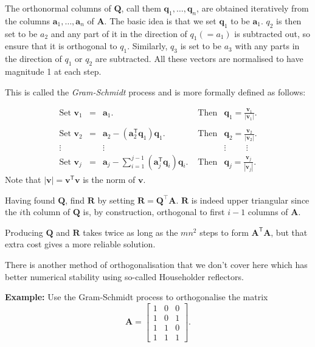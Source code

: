 The orthonormal columns of $\mathbf Q$, call them $\mathbf q_1,\ldots, \mathbf q_n$, are obtained iteratively  from the columns $\mathbf{a}_1,\ldots,\mathbf{a}_n$ of $\mathbf{A}$.  The basic idea is that we set $\mathbf q_1$ to be $\mathbf a_1$.  $q_2$ is then set to be $a_2$ and any part of it in the direction of $q_1 (=a_1)$ is subtracted out, so ensure that it is orthogonal to $q_1$.  Similarly, $q_3$ is set to be $a_3$ with any parts in the direction of $q_1$ or $q_2$ are subtracted.  All these vectors are normalised to have magnitude 1 at each step.

This is called the {\em Gram-Schmidt} process and is more formally defined as follows:

\[
\begin{array}{lllll}
\mbox{Set } \mathbf{v}_1&= &  \mathbf{a}_1. &\mbox{ Then} &   \mathbf{q}_1 =  \frac{\mathbf{v}_1}{|\mathbf{v}_1|}. \\ \\
\mbox{Set } \mathbf{v}_2&= & \mathbf{a}_2-\left(\mathbf{a}_2^\mathsf{T}\mathbf{q}_1\right)\mathbf{q}_1. &\mbox{ Then} &   \mathbf{q}_2  =  \frac{\mathbf{v}_2}{|\mathbf{v}_2|}.  \\


\vdots && \vdots && \vdots \hspace{1cm} \vdots \\

\mbox{Set } \mathbf{v}_j &= & \mathbf{a}_j-\sum\limits_{i=1}^{j-1}\left(\mathbf{a}_j^\mathsf{T}\mathbf{q}_i\right)\mathbf{q}_i. &\mbox{ Then} &   \mathbf{q}_j  =  \frac{\mathbf{v}_j}{|\mathbf{v}_j|}.  

\end{array}
\]
Note that  $|\mathbf v|  = \mathbf v^{\mathsf T} \mathbf v$ is the norm of $\mathbf v$.

Having found $\mathbf Q$, find $\mathbf  R$ by setting $\mathbf R = \mathbf{Q^\top A}$.  $\mathbf R$ is indeed upper triangular since the $i$th column of $\mathbf Q$ is, by construction, orthogonal to first $i-1$ columns of $\mathbf A$.

Producing $\mathbf{Q}$ and $\mathbf{R}$ takes twice as long as the 
$mn^2$ steps to form $\mathbf{A}^\mathsf{T}\mathbf{A}$, but that extra cost gives a more reliable solution.

There is another method of orthogonalisation that we don't cover here  which has  better numerical stability using so-called Householder reflectors.  

{\bf Example:} Use the Gram-Schmidt process to orthogonalise the matrix 
\[ \mathbf{A}=\left[\begin{array}{ccc}1&0&0\\1&0&1\\1&1&0\\1&1&1\end{array}\right]. \]

